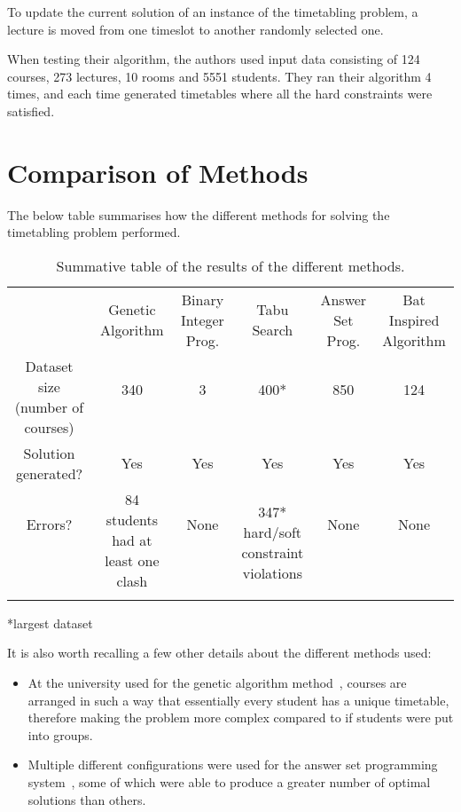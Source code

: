 \documentclass[a4paper, 12pt]{report}
\begin{document}
To update the current solution of an instance of the timetabling problem, a
lecture is moved from one timeslot to another randomly selected one.

When testing their algorithm, the authors used input data consisting of 
124 courses, 273 lectures, 10 rooms and 5551 students. They ran their algorithm 
4 times, and each time generated timetables where all the hard constraints were
satisfied.

\section{Comparison of Methods}

The below table summarises how the different methods for solving the timetabling
problem performed.

\begin{table}
	\begin{tabular}{cccccc}
		\toprule
		\ & \multirow{2}{65pt}{Genetic Algorithm\cite{ga_example}} 
			& \multirow{2}{7.0em}{Binary Integer Prog.\cite{bip_example}} 
			& \multirow{2}{4.0em}{Tabu Search\cite{tabu_example}} 
			& \multirow{2}{5em}{Answer Set Prog.\cite{asp_example}} 
			& \multirow{2}{6em}{Bat Inspired Algorithm\cite{ba_example}} \\
		\\
		\midrule
		\multirow{2}{8.6em}{Dataset size (number of courses)} & 340 & 3 & 400* 
			& 850 & 124 \\ 
		\\
		Solution generated? & Yes & Yes & Yes & Yes & Yes \\
		Errors? & \multirow{3}{65pt}{84 students had at least one clash} & None 
			& \multirow{4}{5em}{347* hard/soft constraint violations} & None 
			& None\\
		\\
		\\
		\\
		\bottomrule
	\end{tabular}
	\caption{\label{method-comparison}Summative table of the results of the 
		different methods.}
\end{table}
*largest dataset

It is also worth recalling a few other details about the different methods used:
\begin{itemize}
	\item At the university used for the genetic algorithm 
		method~\cite{ga_example}, courses are arranged in such a way that 
		essentially every student has a unique timetable, therefore making the 
		problem more complex compared to if students were put into groups.
	\item Multiple different configurations were used for the answer set 
		programming system~\cite{asp_example}, some of which were able to 
		produce a greater number of optimal solutions than others.
\end{itemize}
\end{document}
